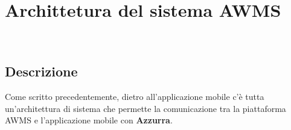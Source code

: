 \chapter{Archittetura del sistema AWMS}
\label{cap:archittettura del sistema AWMS}

\\


\section{Descrizione}
Come scritto precedentemente, dietro all'applicazione mobile c'è tutta un'architettura di sistema che permette la comunicazione tra la piattaforma \gls{AWMS} e l'applicazione mobile con \textbf{Azzurra}.
 
